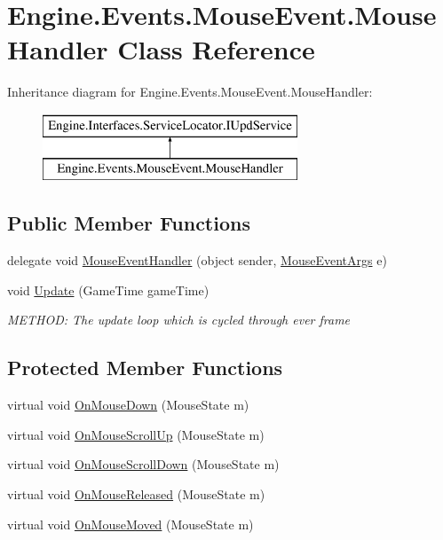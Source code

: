 \hypertarget{a00378}{}\section{Engine.\+Events.\+Mouse\+Event.\+Mouse\+Handler Class Reference}
\label{a00378}
Inheritance diagram for Engine.\+Events.\+Mouse\+Event.\+Mouse\+Handler\+:\begin{figure}[H]
\begin{center}
\leavevmode
\includegraphics[height=2.000000cm]{d7/d08/a00378}
\end{center}
\end{figure}
\subsection*{Public Member Functions}
\begin{DoxyCompactItemize}
\item 
delegate void \hyperlink{a00378_a932e0a6ed83094bb6fa33a6ae64be38a}{Mouse\+Event\+Handler} (object sender, \hyperlink{a00374}{Mouse\+Event\+Args} e)
\item 
void \hyperlink{a00378_ad6c588c046d6a350498fd7875416a151}{Update} (Game\+Time game\+Time)
\begin{DoxyCompactList}\small\item\em M\+E\+T\+H\+OD\+: The update loop which is cycled through ever frame \end{DoxyCompactList}\end{DoxyCompactItemize}
\subsection*{Protected Member Functions}
\begin{DoxyCompactItemize}
\item 
virtual void \hyperlink{a00378_a6e2564dfdc8136f81013f97c594ab217}{On\+Mouse\+Down} (Mouse\+State m)
\item 
virtual void \hyperlink{a00378_af7d850a3b88a8367991f3ac957f1e482}{On\+Mouse\+Scroll\+Up} (Mouse\+State m)
\item 
virtual void \hyperlink{a00378_a20e5fe1f5e747900bdc0f389aae9b935}{On\+Mouse\+Scroll\+Down} (Mouse\+State m)
\item 
virtual void \hyperlink{a00378_a7337e5e2c83fe6946a93d6f1a57bcdd4}{On\+Mouse\+Released} (Mouse\+State m)
\item 
virtual void \hyperlink{a00378_a69716c4b0f065d5939ce73f39999e497}{On\+Mouse\+Moved} (Mouse\+State m)
\end{DoxyCompactItemize}
